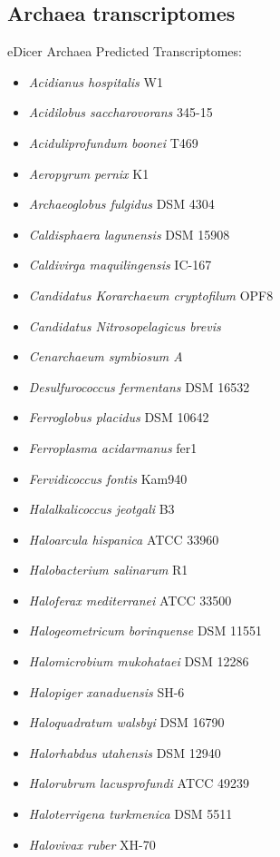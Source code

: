 \subsection{Archaea transcriptomes}\label{sec:edicer_archaea}
eDicer Archaea Predicted Transcriptomes: 
\begin{itemize}
    \item \textit{Acidianus hospitalis} W1
    \item \textit{Acidilobus saccharovorans} 345-15
    \item \textit{Aciduliprofundum boonei} T469
    \item \textit{Aeropyrum pernix} K1
    \item \textit{Archaeoglobus fulgidus} DSM 4304
    \item \textit{Caldisphaera lagunensis} DSM 15908
    \item \textit{Caldivirga maquilingensis} IC-167
    \item \textit{Candidatus Korarchaeum cryptofilum} OPF8
    \item \textit{Candidatus Nitrosopelagicus brevis}
    \item \textit{Cenarchaeum symbiosum A}
    \item \textit{Desulfurococcus fermentans} DSM 16532
    \item \textit{Ferroglobus placidus} DSM 10642
    \item \textit{Ferroplasma acidarmanus} fer1
    \item \textit{Fervidicoccus fontis} Kam940
    \item \textit{Halalkalicoccus jeotgali} B3
    \item \textit{Haloarcula hispanica} ATCC 33960
    \item \textit{Halobacterium salinarum} R1
    \item \textit{Haloferax mediterranei} ATCC 33500
    \item \textit{Halogeometricum borinquense} DSM 11551
    \item \textit{Halomicrobium mukohataei} DSM 12286
    \item \textit{Halopiger xanaduensis} SH-6
    \item \textit{Haloquadratum walsbyi} DSM 16790
    \item \textit{Halorhabdus utahensis} DSM 12940
    \item \textit{Halorubrum lacusprofundi} ATCC 49239
    \item \textit{Haloterrigena turkmenica} DSM 5511
    \item \textit{Halovivax ruber} XH-70

\end{itemize}
